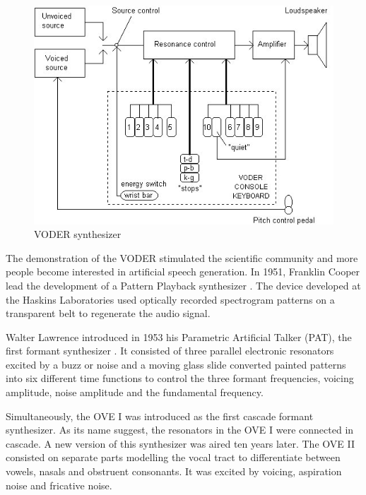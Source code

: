 \begin{figure}[htb]
	\begin{center}
		\includegraphics[width=\textwidth]{images/voder.jpg}
		\caption{VODER synthesizer \cite{Klatt87}}
		\label{fig:voder}
	\end{center}
\end{figure}

The demonstration of the VODER stimulated the scientific community and more people become interested in artificial speech generation. In 1951, Franklin Cooper lead the development of a Pattern Playback synthesizer \cite{Klatt87, flanagan_1973_speech}. The device developed at the Haskins Laboratories used optically recorded spectrogram patterns on a transparent belt to regenerate the audio signal. 

Walter Lawrence introduced in 1953 his Parametric Artificial Talker (PAT), the first formant synthesizer \cite{Klatt87}. It consisted of three parallel electronic resonators excited by a buzz or noise and a moving glass slide converted painted patterns into six different time functions to control the three formant frequencies, voicing amplitude, noise amplitude and the fundamental frequency. 

Simultaneously, the OVE I was introduced as the first cascade formant synthesizer. As its name suggest, the resonators in the OVE I were connected in cascade. A new version of this synthesizer was aired ten years later. The OVE II consisted on separate parts modelling the vocal tract to differentiate between vowels, nasals and obstruent consonants. It was excited by voicing, aspiration noise and fricative noise.

